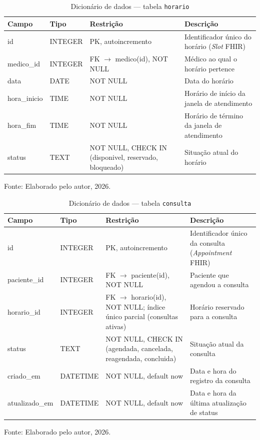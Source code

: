 \documentclass[12pt,a4paper]{extarticle}
\begin{document}
\begin{table}[H]
    \centering
    \caption{Dicionário de dados --- tabela \texttt{horario}}
    {\small
    \begin{tabularx}{\textwidth}{@{}L{3.3cm} L{1.8cm} L{4.0cm} Y@{}}
        \toprule
        \textbf{Campo} & \textbf{Tipo} & \textbf{Restrição} & \textbf{Descrição} \\
        \midrule
        id & INTEGER & PK, autoincremento & Identificador único do horário (\textit{Slot} FHIR) \\
        medico\_\allowbreak{}id & INTEGER & FK $\rightarrow$ medico(id), NOT NULL & Médico ao qual o horário pertence \\
        data & DATE & NOT NULL & Data do horário \\
        hora\_\allowbreak{}inicio & TIME & NOT NULL & Horário de início da janela de atendimento \\
        hora\_\allowbreak{}fim & TIME & NOT NULL & Horário de término da janela de atendimento \\
        status & TEXT & NOT NULL, CHECK IN (disponivel, reservado, bloqueado) & Situação atual do horário \\
        \bottomrule
    \end{tabularx}
    }
    \vspace{0.12cm}
    {\raggedright\footnotesize Fonte: Elaborado pelo autor, 2026.\par}
\end{table}

\begin{table}[H]
    \centering
    \caption{Dicionário de dados --- tabela \texttt{consulta}}
    {\small
    \begin{tabularx}{\textwidth}{@{}L{3.3cm} L{1.8cm} L{4.0cm} Y@{}}
        \toprule
        \textbf{Campo} & \textbf{Tipo} & \textbf{Restrição} & \textbf{Descrição} \\
        \midrule
        id & INTEGER & PK, autoincremento & Identificador único da consulta (\textit{Appointment} FHIR) \\
        paciente\_\allowbreak{}id & INTEGER & FK $\rightarrow$ paciente(id), NOT NULL & Paciente que agendou a consulta \\
        horario\_\allowbreak{}id & INTEGER & FK $\rightarrow$ horario(id), NOT NULL; índice único parcial (consultas ativas) & Horário reservado para a consulta \\
        status & TEXT & NOT NULL, CHECK IN (agendada, cancelada, reagendada, concluida) & Situação atual da consulta \\
        criado\_\allowbreak{}em & DATETIME & NOT NULL, default now & Data e hora do registro da consulta \\
        atualizado\_\allowbreak{}em & DATETIME & NOT NULL, default now & Data e hora da última atualização de status \\
        \bottomrule
    \end{tabularx}
    }
    \vspace{0.12cm}
    {\raggedright\footnotesize Fonte: Elaborado pelo autor, 2026.\par}
\end{table}
\end{document}
